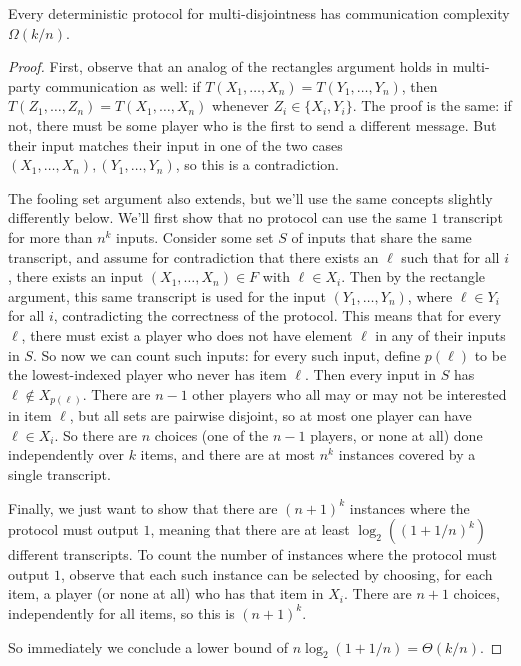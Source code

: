 \begin{theorem}Every deterministic protocol for multi-disjointness has communication complexity $\Omega(k/n)$. 
\end{theorem}
\begin{proof}
First, observe that an analog of the rectangles argument holds in multi-party communication as well: if $T(X_1,\ldots, X_n) = T(Y_1,\ldots, Y_n)$, then $T(Z_1,\ldots, Z_n) = T(X_1,\ldots, X_n)$ whenever $Z_i \in \{X_i, Y_i\}$. The proof is the same: if not, there must be some player who is the first to send a different message. But their input matches their input in one of the two cases $(X_1,\ldots, X_n), (Y_1,\ldots, Y_n)$, so this is a contradiction.

The fooling set argument also extends, but we'll use the same concepts slightly differently below. We'll first show that no protocol can use the same $1$ transcript for more than $n^k$ inputs. Consider some set $S$ of inputs that share the same transcript, and assume for contradiction that there exists an $\ell$ such that for all $i$, there exists an input $(X_1,\ldots, X_n)\in F$ with $\ell \in X_i$. Then by the rectangle argument, this same transcript is used for the input $(Y_1,\ldots, Y_n)$, where $\ell \in Y_i$ for all $i$, contradicting the correctness of the protocol. This means that for every $\ell$, there must exist a player who does not have element $\ell$ in any of their inputs in $S$. So now we can count such inputs: for every such input, define $p(\ell)$ to be the lowest-indexed player who never has item $\ell$. Then every input in $S$ has $\ell \notin X_{p(\ell)}$. There are $n-1$ other players who all may or may not be interested in item $\ell$, but all sets are pairwise disjoint, so at most one player can have $\ell \in X_i$. So there are $n$ choices (one of the $n-1$ players, or none at all) done independently over $k$ items, and there are at most $n^k$ instances covered by a single transcript.

Finally, we just want to show that there are $(n+1)^k$ instances where the protocol must output $1$, meaning that there are at least $\log_2((1+1/n)^k)$ different transcripts. To count the number of instances where the protocol must output $1$, observe that each such instance can be selected by choosing, for each item, a player (or none at all) who has that item in $X_i$. There are $n+1$ choices, independently for all items, so this is $(n+1)^k$. 

So immediately we conclude a lower bound of $n\log_2(1+1/n) = \Theta(k/n)$. 
\end{proof}

